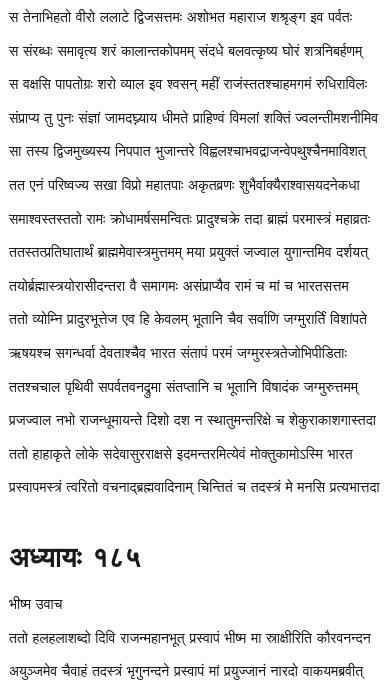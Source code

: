 \twolineshloka
{स तेनाभिहतो वीरो ललाटे द्विजसत्तमः}
{अशोभत महाराज शश्रृङ्ग इव पर्वतः}


\twolineshloka
{स संरब्धः समावृत्य शरं कालान्तकोपमम्}
{संदधे बलवत्कृष्य घोरं शत्रनिबर्हणम्}


\twolineshloka
{स वक्षसि पापतोग्रः शरो व्याल इव श्वसन्}
{महीं राजंस्ततश्चाहमगमं रुधिराविलः}


\twolineshloka
{संप्राप्य तु पुनः संज्ञां जामदघ्न्याय धीमते}
{प्राहिण्वं विमलां शक्तिं ज्वलन्तीमशनीमिव}


\twolineshloka
{सा तस्य द्विजमुख्यस्य निपपात भुजान्तरे}
{विह्वलश्चाभवद्राजन्वेपथुश्चैनमाविशत्}


\twolineshloka
{तत एनं परिष्वज्य सखा विप्रो महातपाः}
{अकृतव्रणः शुभैर्वाक्यैराश्वासयदनेकधा}


\twolineshloka
{समाश्वस्तस्ततो रामः क्रोधामर्षसमन्वितः}
{प्रादुश्चक्रे तदा ब्राह्मं परमास्त्रं महाव्रतः}


\twolineshloka
{ततस्तत्प्रतिघातार्थं ब्राह्ममेवास्त्रमुत्तमम्}
{मया प्रयुक्तं जज्वाल युगान्तमिव दर्शयत्}


\twolineshloka
{तयोर्ब्रह्मास्त्रयोरासीदन्तरा वै समागमः}
{असंप्राप्यैव रामं च मां च भारतसत्तम}


\twolineshloka
{ततो व्योम्नि प्रादुरभूत्तेज एव हि केवलम्}
{भूतानि चैव सर्वाणि जग्मुरार्तिं विशांपते}


\twolineshloka
{ऋषयश्च सगन्धर्वा देवताश्चैव भारत}
{संतापं परमं जग्मुरस्त्रतेजोभिपीडिताः}


\twolineshloka
{ततश्चचाल पृथिवी सपर्वतवनद्रुमा}
{संतप्तानि च भूतानि विषादंक जग्मुरुत्तमम्}


\twolineshloka
{प्रजज्वाल नभो राजन्धूमायन्ते दिशो दश}
{न स्थातुमन्तरिक्षे च शेकुराकाशगास्तदा}


\twolineshloka
{ततो हाहाकृते लोके सदेवासुरराक्षसे}
{इदमन्तरमित्येवं मोक्तुकामोऽस्मि भारत}


\twolineshloka
{प्रस्वापमस्त्रं त्वरितो वचनाद्ब्रह्मवादिनाम्}
{चिन्तितं च तदस्त्रं मे मनसि प्रत्यभात्तदा}


\chapter{अध्यायः १८५}
\twolineshloka
{भीष्म उवाच}
{}


\twolineshloka
{ततो हलहलाशब्दो दिवि राजन्महानभूत्}
{प्रस्वापं भीष्म मा स्राक्षीरिति कौरवनन्दन}


\twolineshloka
{अयुञ्जमेव चैवाहं तदस्त्रं भृगुनन्दने}
{प्रस्वापं मां प्रयुज्जानं नारदो वाकयमब्रवीत्}


